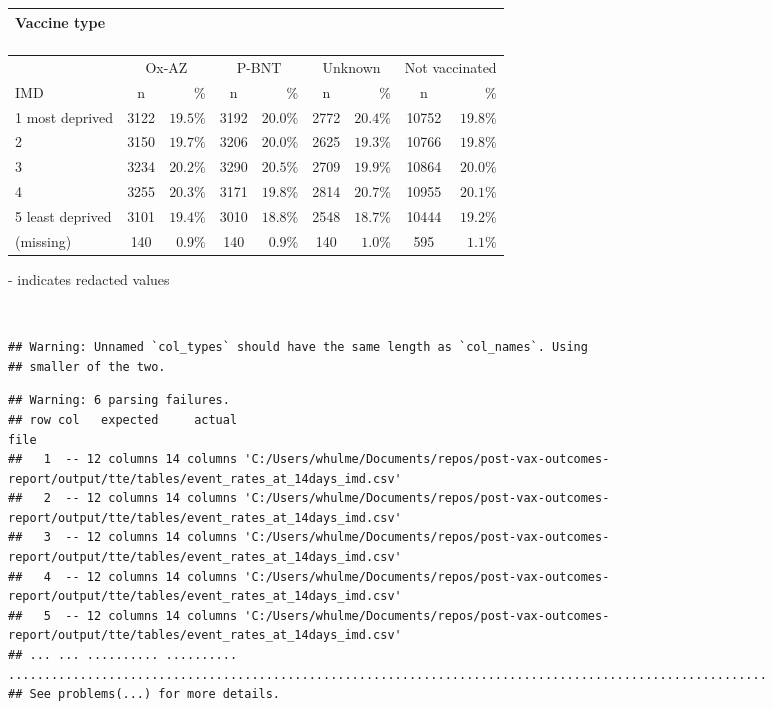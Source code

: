 \documentclass[
]{article}
\begin{document}
\captionsetup[table]{labelformat=empty,skip=1pt}
\begin{longtable}{lcrcrcrcr}
\caption*{
\large Vaccine type\\ 
\small \\ 
} \\ 
\toprule
& \multicolumn{2}{c}{Ox-AZ} & \multicolumn{2}{c}{P-BNT} & \multicolumn{2}{c}{Unknown} & \multicolumn{2}{c}{Not vaccinated} \\ 
 \cmidrule(lr){2-3}\cmidrule(lr){4-5}\cmidrule(lr){6-7}\cmidrule(lr){8-9}
IMD & n & \% & n & \% & n & \% & n & \% \\ 
\midrule
1 most deprived & 3122 & $19.5\%$ & 3192 & $20.0\%$ & 2772 & $20.4\%$ & 10752 & $19.8\%$ \\ 
2 & 3150 & $19.7\%$ & 3206 & $20.0\%$ & 2625 & $19.3\%$ & 10766 & $19.8\%$ \\ 
3 & 3234 & $20.2\%$ & 3290 & $20.5\%$ & 2709 & $19.9\%$ & 10864 & $20.0\%$ \\ 
4 & 3255 & $20.3\%$ & 3171 & $19.8\%$ & 2814 & $20.7\%$ & 10955 & $20.1\%$ \\ 
5 least deprived & 3101 & $19.4\%$ & 3010 & $18.8\%$ & 2548 & $18.7\%$ & 10444 & $19.2\%$ \\ 
(missing) & 140 & $0.9\%$ & 140 & $0.9\%$ & 140 & $1.0\%$ & 595 & $1.1\%$ \\ 
\bottomrule
\end{longtable}
\begin{minipage}{\linewidth}
- indicates redacted values\\ 
\end{minipage}

~ ~

\begin{verbatim}
## Warning: Unnamed `col_types` should have the same length as `col_names`. Using
## smaller of the two.
\end{verbatim}

\begin{verbatim}
## Warning: 6 parsing failures.
## row col   expected     actual                                                                                                       file
##   1  -- 12 columns 14 columns 'C:/Users/whulme/Documents/repos/post-vax-outcomes-report/output/tte/tables/event_rates_at_14days_imd.csv'
##   2  -- 12 columns 14 columns 'C:/Users/whulme/Documents/repos/post-vax-outcomes-report/output/tte/tables/event_rates_at_14days_imd.csv'
##   3  -- 12 columns 14 columns 'C:/Users/whulme/Documents/repos/post-vax-outcomes-report/output/tte/tables/event_rates_at_14days_imd.csv'
##   4  -- 12 columns 14 columns 'C:/Users/whulme/Documents/repos/post-vax-outcomes-report/output/tte/tables/event_rates_at_14days_imd.csv'
##   5  -- 12 columns 14 columns 'C:/Users/whulme/Documents/repos/post-vax-outcomes-report/output/tte/tables/event_rates_at_14days_imd.csv'
## ... ... .......... .......... ..........................................................................................................
## See problems(...) for more details.
\end{verbatim}
\end{document}

